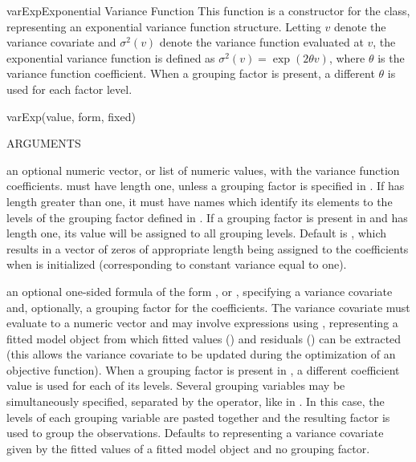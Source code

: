 \documentclass[pdftex]{article} \usepackage{url,graphicx}
\renewcommand{\Twiddle}{\mbox{\(\sim\)}}
\begin{document}
\begin{Helpfile}{varExp}{Exponential Variance Function}
This function is a constructor for the  class,
representing an exponential variance function structure. Letting
$v$ denote the variance covariate and $\sigma^2(v)$
denote the variance function evaluated at $v$, the exponential
variance function is defined as $\sigma^2(v) = \exp(2\theta v)$, where
$\theta$ is the variance function coefficient. When a grouping factor
is present, a different $\theta$ is used for each factor level.
\begin{Example}
varExp(value, form, fixed)
\end{Example}
\begin{Argument}{ARGUMENTS}
\item[\Co{value:}]
an optional numeric vector, or list of numeric values,
with the variance function coefficients.  must have
length one, unless a grouping factor is specified in .
If  has length greater than one, it must have names
which identify its elements to the levels of the grouping factor
defined in . If a grouping factor is present in
 and  has length one, its value will be
assigned to all grouping levels. Default is , which
results in a vector of zeros of appropriate length being assigned to
the coefficients when  is initialized (corresponding
to constant variance equal to one).
\item[\Co{form:}] an optional one-sided formula of the form
  \Co{\Twiddle v}, or \Co{\Twiddle v | g}, specifying a variance
  covariate  and, optionally, a grouping factor  for the
  coefficients. The variance covariate must evaluate to a numeric
  vector and may involve expressions using , representing a
  fitted model object from which fitted values () and
  residuals () can be extracted (this allows the variance
  covariate to be updated during the optimization of an objective
  function). When a grouping factor is present in , a
  different coefficient value is used for each of its levels. Several
  grouping variables may be simultaneously specified, separated by the
  \Co{*} operator, like in \Co{{\Twiddle} v | g1 * g2 * g3}. In this
  case, the levels of each grouping variable are pasted together and
  the resulting factor is used to group the observations. Defaults to
  \Co{\Twiddle fitted(.)} representing a variance covariate given by
  the fitted values of a fitted model object and no grouping factor.
\item[\Co{fixed:}]

\end{Argument}
\end{Helpfile}
\end{document}
